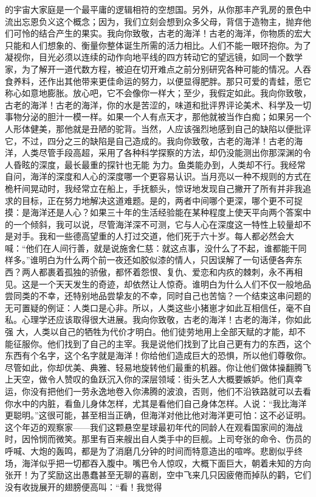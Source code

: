 \documentclass{article}
\begin{document}
\newpage
的宇宙大家庭是一个最平庸的逻辑相符的空想国。另外，从你那丰产乳房的景色中流出忘恩负义这个概念；因为，我们立刻会想到众多父母，背信于造物主，抛弃他们可怜的结合产生的果实。我向你致敬，古老的海洋！古老的海洋，你物质的宏大只能和人们想象的、衡量你整体诞生所需的活力相比。人们不能一眼环抱你。为了凝视你，目光必须以连续的动作向地平线的四方转动它的望远镜，如同一个数学家，为了解开一道代数方程，被迫在切开难点之前分别研究各种可能的情况。人吞食养料，还作出其他带来更佳命运的努力，以便显得肥胖。那只可爱的青蛙，愿它称心如意地膨胀。放心吧，它不会像你一样大；至少，我假定如此。我向你致敬，古老的海洋！古老的海洋，你的水是苦涩的，味道和批评界评论美术、科学及一切事物分泌的胆汁一模一样。如果一个人有点天才，那他就被当作白痴；如果另一个人形体健美，那他就是丑陋的驼背。当然，人应该强烈地感到自己的缺陷以便批评它，不过，四分之三的缺陷是自己造成的。我向你致敬，古老的海洋！古老的海洋，人类尽管手段高超，采用了各种科学探察的方法，却仍没能测出你那深渊的令人昏眩的深度，最长最重的探针也无能
\newpage
为力。鱼类能办到，人类却不行。我经常自问，海洋的深度和人心的深度哪一个更容易认识。当月亮以一种不规则的方式在桅杆间晃动时，我经常立在船上，手抚额头，惊讶地发现自己撇开了所有并非我追求的目标，正在努力地解决这道难题。是的，两者中间哪个更深，哪个更不可捉摸：是海洋还是人心？如果三十年的生活经验能在某种程度上使天平向两个答案中的一个倾斜，我可以说，尽管海洋深不可测，它与人心在深度这一特性上较量却不是对手。我和一些德高望重的人打过交道，他们死于六十岁。每人都必然会大喊：“他们在人间行善，就是说施舍仁慈：就这点事，没什么了不起，谁都能干同样多。”谁明白为什么两个前一夜还如胶似漆的情人，只因误解了一句话便各奔东西？两人都裹着孤独的骄傲，都怀着怨恨、复仇、爱恋和内疚的棘刺，永不再相见。这是一个天天发生的奇迹，却依然让人惊奇。谁明白为什么人们不仅一般地品尝同类的不幸，还特别地品尝挚友的不幸，同时自己也苦恼？一个结束这串问题的无可置疑的例证：人类口是心非。所以，人类这些小猪崽才如此互相信任，毫不自私。心理学还应该取得很大进展。我向你致敬，古老的海洋！古老的海洋，你如此强
\newpage
大，人类以自己的牺牲为代价才明白。他们徒劳地用上全部天赋的才能，却不能征服你。他们找到了自己的主宰。我是说他们找到了比自己更有力的东西，这个东西有个名字，这个名字就是海洋！你给他们造成巨大的恐惧，所以他们尊敬你。尽管如此，你却优美、典雅、轻易地旋转他们最重的机器。你让他们做体操翻腾飞上天空，做令人赞叹的鱼跃沉入你的深层领域：街头艺人大概要嫉妒。他们真幸运，你没有把他们一劳永逸地卷入你沸腾的波浪，否则，他们不沿铁路就可以去看你水中的内脏，看鱼儿身体怎样，尤其是看他们自己身体怎样。人说：“我比海洋更聪明。”这很可能，甚至相当正确，但海洋对他比他对海洋更可怕：这不必证明。这个年迈的观察家——我们这颗悬空星球最初年代的同龄人在观看国家间的海战时，因怜悯而微笑。那里有百来艘出自人类手中的巨舰。上司夸张的命令、伤员的呼喊、大炮的轰鸣，都是为了消磨几分钟的时间而特意造出的喧哗。悲剧似乎终场，海洋似乎把一切都吞入腹中。嘴巴令人惊叹，大概下面巨大，朝着未知的方向张开！为了奖励这出愚蠢甚至无聊的喜剧，空中飞来几只因疲倦而掉队的鹳，它们没有收拢展开的翅膀便高叫：“看！我觉得
\end{document}
